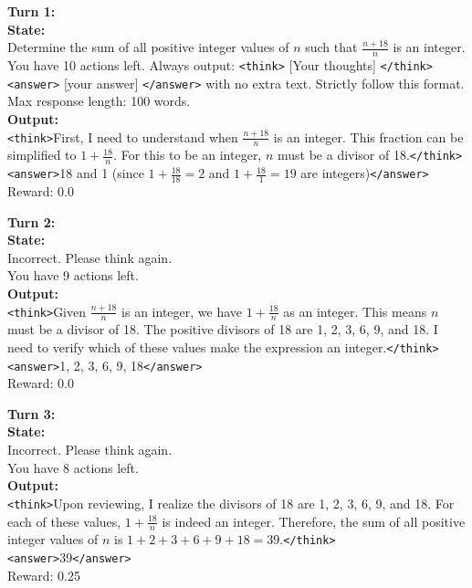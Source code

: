 \begin{tcolorbox}[breakable, colback=gray!2, colframe=black, boxrule=0.5pt, arc=2pt, width=\linewidth, title=Box 6: Model rollout after multi-turn RL training with UFO (Success Case)]
\label{box:case3}
\textbf{Turn 1:} \\
\textbf{State:} \\
Determine the sum of all positive integer values of \(n\) such that \(\frac{n+18}{n}\) is an integer. \\
You have 10 actions left. Always output: \texttt{<think>} [Your thoughts] \texttt{</think>} \texttt{<answer>} [your answer] \texttt{</answer>} with no extra text. Strictly follow this format. Max response length: 100 words. \\
\textbf{Output:} \\
\texttt{<think>}First, I need to understand when \(\frac{n+18}{n}\) is an integer. This fraction can be simplified to \(1 + \frac{18}{n}\). For this to be an integer, \(n\) must be a divisor of 18.\texttt{</think>} \\
\texttt{<answer>}18 and 1 (since \(1 + \frac{18}{18} = 2\) and \(1 + \frac{18}{1} = 19\) are integers)\texttt{</answer>} \\
Reward: 0.0

\vspace{4pt}
\textbf{Turn 2:} \\
\textbf{State:} \\
Incorrect. Please think again. \\
You have 9 actions left. \\
\textbf{Output:} \\
\texttt{<think>}Given \(\frac{n+18}{n}\) is an integer, we have \(1 + \frac{18}{n}\) as an integer. This means \(n\) must be a divisor of 18. The positive divisors of 18 are 1, 2, 3, 6, 9, and 18. I need to verify which of these values make the expression an integer.\texttt{</think>} \\
\texttt{<answer>}1, 2, 3, 6, 9, 18\texttt{</answer>} \\
Reward: 0.0

\vspace{4pt}
\textbf{Turn 3:} \\
\textbf{State:} \\
Incorrect. Please think again. \\
You have 8 actions left. \\
\textbf{Output:} \\
\texttt{<think>}Upon reviewing, I realize the divisors of 18 are 1, 2, 3, 6, 9, and 18. For each of these values, \(1 + \frac{18}{n}\) is indeed an integer. Therefore, the sum of all positive integer values of \(n\) is \(1 + 2 + 3 + 6 + 9 + 18 = 39\).\texttt{</think>} \\
\texttt{<answer>}39\texttt{</answer>} \\
Reward: 0.25
\end{tcolorbox}

